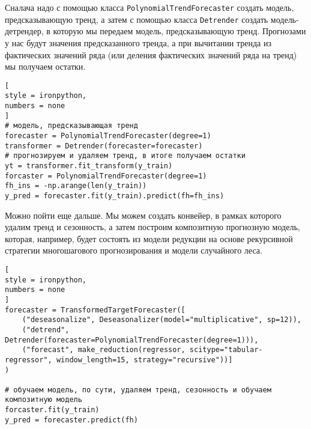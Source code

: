 \documentclass[%
	11pt,
	a4paper,
	utf8,
		]{article}
\begin{document}
Сналача надо с помощью класса \verb|PolynomialTrendForecaster| создать модель, предсказывающую тренд, а затем с помощью класса \verb|Detrender| создать модель-детрендер, в которую мы передаем модель, предсказывающую тренд. Прогнозами у нас будут значения предсказанного тренда, а при вычитании тренда из фактических значений ряда (или деления фактических значений ряда на тренд) мы получаем остатки.
\begin{lstlisting}[
style = ironpython,
numbers = none
]
# модель, предсказывающая тренд
forecaster = PolynomialTrendForecaster(degree=1)
transformer = Detrender(forecaster=forecaster)
# прогнозируем и удаляем тренд, в итоге получаем остатки
yt = transformer.fit_transform(y_train)
forcaster = PolynomialTrendForecaster(degree=1)
fh_ins = -np.arange(len(y_train))
y_pred = forecaster.fit(y_train).predict(fh=fh_ins)
\end{lstlisting} 

Можно пойти еще дальше. Мы можем создать конвейер, в рамках которого удалим тренд и сезонность, а затем построим композитную прогнозную модель, которая, например, будет состоять из модели редукции на основе рекурсивной стратегии многошагового прогнозирования и модели случайного леса.
\begin{lstlisting}[
style = ironpython,
numbers = none
]
forecaster = TransformedTargetForecaster([
    ("deseasonalize", Deseasonalizer(model="multiplicative", sp=12)),
    ("detrend", Detrender(forecaster=PolynomialTrendForecaster(degree=1))),
    ("forecast", make_reduction(regressor, scitype="tabular-regressor", window_length=15, strategy="recursive"))]
)

# обучаем модель, по сути, удаляем тренд, сезонность и обучаем композитную модель
forcaster.fit(y_train)
y_pred = forecaster.predict(fh)
\end{lstlisting}
\end{document}
